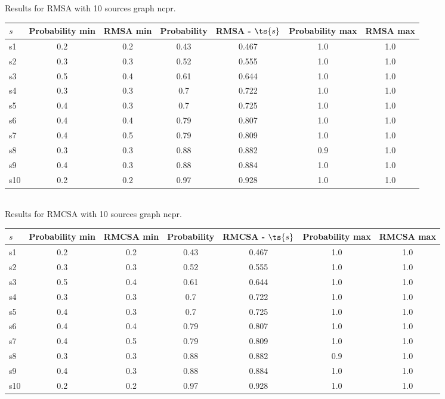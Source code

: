 \documentclass{article}
\begin{document}
\noindent Results for RMSA with 10 sources graph ncpr.

\noindent\begin{tabular}{|l|c|c|c|c|c|c|}
\hline
$s$& Probability min & RMSA min & Probability & RMSA - $\ts{s}$ & Probability max & RMSA max\\
\hline
s1 &0.2 & 0.2 & 0.43 & 0.467 & 1.0 & 1.0\\
\hline
s2 &0.3 & 0.3 & 0.52 & 0.555 & 1.0 & 1.0\\
\hline
s3 &0.5 & 0.4 & 0.61 & 0.644 & 1.0 & 1.0\\
\hline
s4 &0.3 & 0.3 & 0.7 & 0.722 & 1.0 & 1.0\\
\hline
s5 &0.4 & 0.3 & 0.7 & 0.725 & 1.0 & 1.0\\
\hline
s6 &0.4 & 0.4 & 0.79 & 0.807 & 1.0 & 1.0\\
\hline
s7 &0.4 & 0.5 & 0.79 & 0.809 & 1.0 & 1.0\\
\hline
s8 &0.3 & 0.3 & 0.88 & 0.882 & 0.9 & 1.0\\
\hline
s9 &0.4 & 0.3 & 0.88 & 0.884 & 1.0 & 1.0\\
\hline
s10 &0.2 & 0.2 & 0.97 & 0.928 & 1.0 & 1.0\\
\hline
\end{tabular}\\

\noindent Results for RMCSA with 10 sources graph ncpr.

\noindent\begin{tabular}{|l|c|c|c|c|c|c|}
\hline
$s$& Probability min & RMCSA min & Probability & RMCSA - $\ts{s}$ & Probability max & RMCSA max\\
\hline
s1 &0.2 & 0.2 & 0.43 & 0.467 & 1.0 & 1.0\\
\hline
s2 &0.3 & 0.3 & 0.52 & 0.555 & 1.0 & 1.0\\
\hline
s3 &0.5 & 0.4 & 0.61 & 0.644 & 1.0 & 1.0\\
\hline
s4 &0.3 & 0.3 & 0.7 & 0.722 & 1.0 & 1.0\\
\hline
s5 &0.4 & 0.3 & 0.7 & 0.725 & 1.0 & 1.0\\
\hline
s6 &0.4 & 0.4 & 0.79 & 0.807 & 1.0 & 1.0\\
\hline
s7 &0.4 & 0.5 & 0.79 & 0.809 & 1.0 & 1.0\\
\hline
s8 &0.3 & 0.3 & 0.88 & 0.882 & 0.9 & 1.0\\
\hline
s9 &0.4 & 0.3 & 0.88 & 0.884 & 1.0 & 1.0\\
\hline
s10 &0.2 & 0.2 & 0.97 & 0.928 & 1.0 & 1.0\\
\hline
\end{tabular}\\
\end{document}

